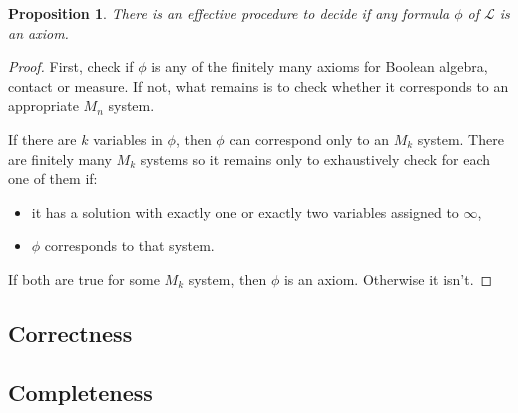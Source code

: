 \documentclass{article}
\newtheorem*{proposition}{Proposition}
\newcommand{\lang}{\mathcal{L}}
\begin{document}
\begin{proposition}
  There is an effective procedure to decide if any formula $\phi$ of $\lang$ is an axiom.
\end{proposition}
\begin{proof}
  First, check if $\phi$ is any of the finitely many axioms for Boolean algebra, contact or measure. If not, what remains is to check whether it corresponds to an appropriate $M_n$ system.

  If there are $k$ variables in $\phi$, then $\phi$ can correspond only to an $M_k$ system. There are finitely many $M_k$ systems so it remains only to exhaustively check for each one of them if:
  \begin{itemize}
  \item it has a solution with exactly one or exactly two variables assigned to $\infty$,
  \item $\phi$ corresponds to that system.
  \end{itemize}
  If both are true for some $M_k$ system, then $\phi$ is an axiom. Otherwise it isn't.
\end{proof}

\subsection{Correctness}

\subsection{Completeness}
\end{document}
